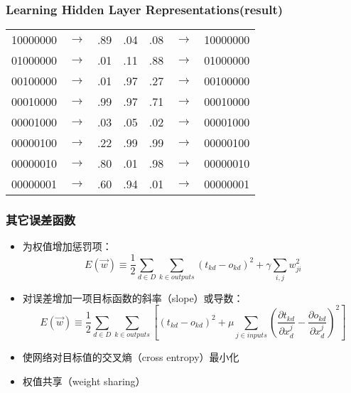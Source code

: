 \documentclass{beamer}
\begin{document}
\begin{frame}
\frametitle{Learning Hidden Layer Representations(result)}
\label{sec-3-8}



\begin{center}
\begin{tabular}{rlrrrlr}
 10000000  &  $\rightarrow$  &  .89  &  .04  &  .08  &  $\rightarrow$  &  10000000  \\
 01000000  &  $\rightarrow$  &  .01  &  .11  &  .88  &  $\rightarrow$  &  01000000  \\
 00100000  &  $\rightarrow$  &  .01  &  .97  &  .27  &  $\rightarrow$  &  00100000  \\
 00010000  &  $\rightarrow$  &  .99  &  .97  &  .71  &  $\rightarrow$  &  00010000  \\
 00001000  &  $\rightarrow$  &  .03  &  .05  &  .02  &  $\rightarrow$  &  00001000  \\
 00000100  &  $\rightarrow$  &  .22  &  .99  &  .99  &  $\rightarrow$  &  00000100  \\
 00000010  &  $\rightarrow$  &  .80  &  .01  &  .98  &  $\rightarrow$  &  00000010  \\
 00000001  &  $\rightarrow$  &  .60  &  .94  &  .01  &  $\rightarrow$  &  00000001  \\
\end{tabular}
\end{center}
\end{frame}
\begin{frame}
\frametitle{其它误差函数}
\label{sec-3-9}


\begin{itemize}
\item 为权值增加惩罚项：
  \[E(\vec{w}) \equiv \frac{1}{2}\sum_{d \in D} \sum_{k \in outputs} (t_{kd} -o_{kd})^2 + \gamma \sum_{i,j}w_{ji}^{2}\]
\item 对误差增加一项目标函数的斜率（slope）或导数：
  \[E(\vec{w}) \equiv \frac{1}{2} \sum_{d \in D} \sum_{k \in outputs} \left[ (t_{kd} -
    o_{kd})^2 + \mu \sum_{j \in inputs}
    \left(\frac{\partial t_{kd}}{\partial x^j_d} - \frac{\partial
    o_{kd}}{\partial x^j_d}\right)^2 \right]\]
\item 使网络对目标值的交叉熵（cross entropy）最小化
\item 权值共享（weight sharing）
\end{itemize}
\end{frame}
\end{document}
